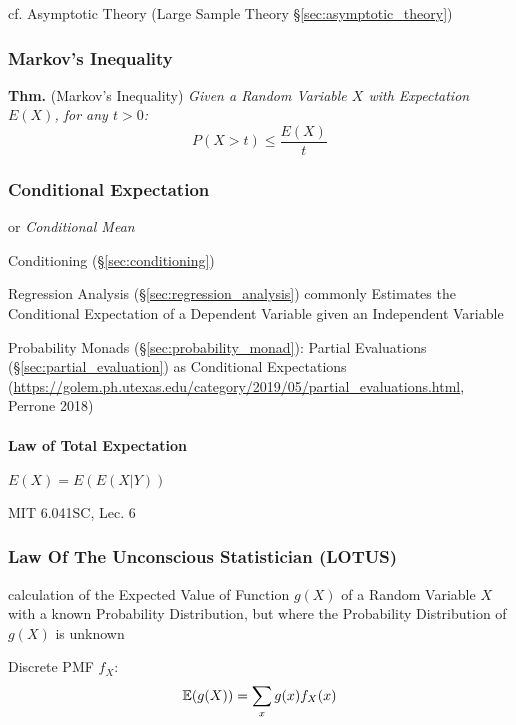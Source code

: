 \fist cf. Asymptotic Theory (Large Sample Theory \S\ref{sec:asymptotic_theory})



\subsubsection{Markov's Inequality}\label{sec:markovs_inequality}

\textbf{Thm.} (Markov's Inequality) \emph{
  Given a Random Variable $X$ with Expectation $E(X)$, for any $t > 0$:
  \[
    P(X > t) \leq \frac{E(X)}{t}
  \]
}



\subsubsection{Conditional Expectation}\label{sec:conditional_expectation}

or \emph{Conditional Mean}

\fist Conditioning (\S\ref{sec:conditioning})

\fist Regression Analysis (\S\ref{sec:regression_analysis}) commonly Estimates
the Conditional Expectation of a Dependent Variable given an Independent
Variable

\fist Probability Monads (\S\ref{sec:probability_monad}): Partial Evaluations
(\S\ref{sec:partial_evaluation}) as Conditional Expectations
(\url{https://golem.ph.utexas.edu/category/2019/05/partial_evaluations.html},
Perrone 2018)



\paragraph{Law of Total Expectation}\label{sec:total_expectation}\hfill

$E(X) = E(E(X | Y))$

MIT 6.041SC, Lec. 6



\subsubsection{Law Of The Unconscious Statistician (LOTUS)}\label{sec:lotus}

calculation of the Expected Value of Function $g(X)$ of a Random Variable $X$
with a known Probability Distribution, but where the Probability Distribution of
$g(X)$ is unknown

Discrete PMF $f_X$:
\[
  \mathbb{E}(g(X)) = \sum_x g(x) f_X(x)
\]

